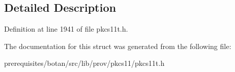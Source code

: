 \subsection{Detailed Description}


Definition at line 1941 of file pkcs11t.\+h.



The documentation for this struct was generated from the following file\+:\begin{DoxyCompactItemize}
\item 
prerequisites/botan/src/lib/prov/pkcs11/pkcs11t.\+h\end{DoxyCompactItemize}
